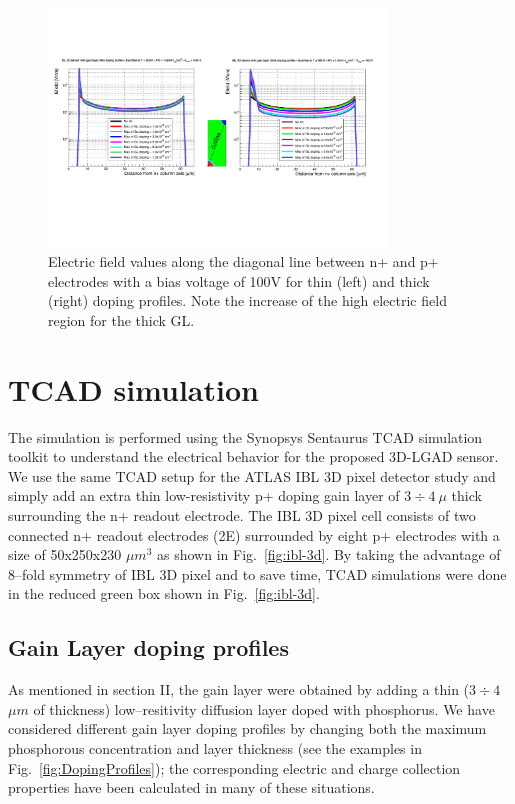 \documentclass[aps,pt14,superscriptaddress,floatfix,nofootinbib]{revtex4}
\begin{document}
\begin{figure}[hbtp]
\begin{center}
\includegraphics[width=0.80\textwidth,keepaspectratio]{figures1/ThinThickEfield.pdf}
\caption{Electric field values along the diagonal line between n+ and p+ electrodes with a bias voltage of 100V for thin (left) and thick (right) doping profiles. Note the increase of the high electric field region for the thick GL.\label{fig:efield}} 
\end{center}
\end{figure}

\section{TCAD simulation}
The simulation is performed using the Synopsys Sentaurus TCAD simulation toolkit
to understand the electrical behavior for the proposed 3D-LGAD sensor. 
We use the same TCAD setup for the ATLAS IBL 3D pixel detector study and
simply add an extra thin low-resistivity p+ doping gain layer of $3\div 4\ \mu$ thick
surrounding the n+ readout electrode. The IBL 3D pixel cell consists of two connected n+ 
readout electrodes (2E) surrounded by eight p+ electrodes with a size of 50x250x230 $\mu m^3$
as shown in Fig.~\ref{fig:ibl-3d}. By taking the advantage of 8--fold symmetry of IBL 3D pixel and to save time, TCAD simulations were done in the reduced green box shown in Fig.~\ref{fig:ibl-3d}. 

\subsection{Gain Layer doping profiles}

As mentioned in section II, the gain layer were obtained by adding a thin ($3\div 4$ $\mu m$ of thickness) low--resitivity diffusion layer doped with phosphorus. We have considered different gain layer doping profiles by changing both the maximum phosphorous concentration and layer thickness (see the examples in  Fig.~\ref{fig:DopingProfiles}); the corresponding electric and charge collection properties have been calculated in many of these situations.
\end{document}
